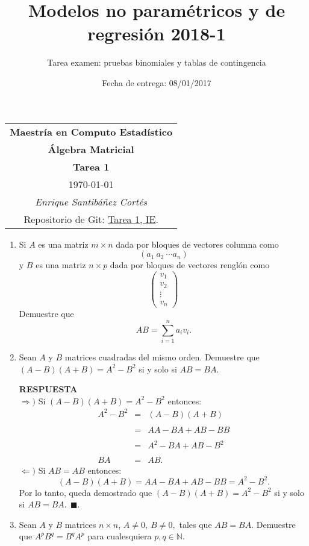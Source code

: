 \documentclass[11pt,letterpaper]{article}
\title{Modelos no paramétricos y de regresión 2018-1}
\author{Tarea examen: pruebas binomiales y tablas de contingencia}
\date{Fecha de entrega: 08/01/2017}
\newcommand{\res}{\textbf{RESPUESTA}\\}
\newcommand{\finf}{\blacksquare.}
\begin{document}
\begin{table}[ht]
\centering
\begin{tabular}{c}
\textbf{Maestría en Computo Estadístico}\\
\textbf{Álgebra Matricial} \\
\textbf{Tarea 1}\\
\today \\
\emph{Enrique Santibáñez Cortés}\\
Repositorio de Git: \href{https://github.com/Enriquesec/Inferencia_Estad-stica/tree/master/Tareas/Tarea_1}{Tarea 1, IE}.
\end{tabular}
\end{table}

\begin{enumerate}
\item Si $A$ es una matriz $m\times n$ dada por bloques de vectores columna como $$ (a_1\ a_2\ \cdots a_n)$$ y $B$ es una matriz $n\times p$ dada por bloques de vectores renglón como
\begin{equation*}
\left(\begin{array}{c}
v_1\\
v_2\\
\vdots \\
v_n
\end{array}
\right)
\end{equation*}
Demuestre que $$AB=\sum_{i=1}^na_iv_i.$$

\item Sean $A$ y $B$ matrices cuadradas del mismo orden. Demuestre que $(A-B)(A+B)=A^2-B^2$ si y solo si $AB=BA.$

\res
$\Rightarrow)$ Si $(A-B)(A+B)=A^2-B^2$ entonces:
\begin{equation*}
\begin{array}{ccc}
A^2-B^2&=&(A-B)(A+B)\\
&&\\
&=&AA-BA+AB-BB\\
&&\\
&=&A^2-BA+AB-B^2 \\
&&\\
BA&=&AB.
\end{array}
\end{equation*}
$\Leftarrow)$ Si $AB=AB$ entonces:
$$(A-B)(A+B)=AA-BA+AB-BB=A^2-B^2.$$
Por lo tanto, queda demostrado que $(A-B)(A+B)=A^2-B^2$ si y solo si $AB=BA.\ \ \finf$

\item Sean $A$ y $B$ matrices $n\times n$, $A\neq 0, \ B\neq 0,$ tales que $AB=BA.$ Demuestre que $A^pB^q=B^qA^p$ para cualesquiera $p,q\in \mathbb{N}.$


\end{enumerate}
\end{document}
